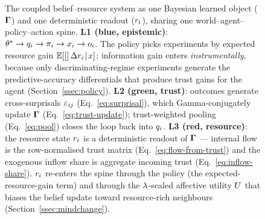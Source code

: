 \begin{figure}[!ht]
{%
}
\caption{The coupled belief--resource system as one Bayesian learned
object ($\boldsymbol{\Gamma}$) and one deterministic readout ($r_{i}$),
sharing one world--agent--policy--action spine. \textbf{L1 (blue,
epistemic)}: $\theta^{*} \to q_i \to \pi_i \to x_i \to o_i$.
The policy picks experiments by expected resource gain
$\mathbb{E}\!\left[[\right]\Delta r_{i}\!\mid\!x]$; information gain enters
\emph{instrumentally}, because only discriminating-regime experiments
generate the predictive-accuracy differentials that produce trust gains
for the agent (Section~\ref{ssec:policy}). \textbf{L2 (green, trust)}:
outcomes generate cross-surprisals $\varepsilon_{ij}$
(Eq.~\ref{eq:surprisal}), which Gamma-conjugately update $\boldsymbol{\Gamma}$
(Eq.~\ref{eq:trust-update}); trust-weighted pooling (Eq.~\ref{eq:pool})
closes the loop back into $q_i$. \textbf{L3 (red, resource)}: the
resource state $r_{i}$ is a deterministic readout of
$\boldsymbol{\Gamma}$ --- internal flow is the row-normalised trust matrix
(Eq.~\ref{eq:flow-from-trust}) and the exogenous inflow share is
aggregate incoming trust (Eq.~\ref{eq:inflow-share}). $r_{i}$
re-enters the spine through the policy (the
expected-resource-gain term) and through the $\lambda$-scaled affective
utility $U$ that biases the belief update toward resource-rich
neighbours (Section~\ref{ssec:mindchange}).}
\label{fig:coupled-loop}
\end{figure}

